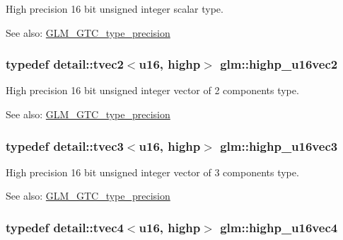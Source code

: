 High precision 16 bit unsigned integer scalar type. \begin{Desc}
\item[See also:]\hyperlink{group__gtc__type__precision}{GLM\_\-GTC\_\-type\_\-precision} \end{Desc}
\hypertarget{group__gtc__type__precision_gfad4245d389a4990eb505cd74a2d0a6f}{
\subsubsection[highp\_\-u16vec2]{\setlength{\rightskip}{0pt plus 5cm}typedef detail::tvec2$<$u16, highp$>$ {\bf glm::highp\_\-u16vec2}}}
\label{group__gtc__type__precision_gfad4245d389a4990eb505cd74a2d0a6f}


High precision 16 bit unsigned integer vector of 2 components type. \begin{Desc}
\item[See also:]\hyperlink{group__gtc__type__precision}{GLM\_\-GTC\_\-type\_\-precision} \end{Desc}
\hypertarget{group__gtc__type__precision_gd98b30ad9bbfb79233340be3ba53ceb6}{
\subsubsection[highp\_\-u16vec3]{\setlength{\rightskip}{0pt plus 5cm}typedef detail::tvec3$<$u16, highp$>$ {\bf glm::highp\_\-u16vec3}}}
\label{group__gtc__type__precision_gd98b30ad9bbfb79233340be3ba53ceb6}


High precision 16 bit unsigned integer vector of 3 components type. \begin{Desc}
\item[See also:]\hyperlink{group__gtc__type__precision}{GLM\_\-GTC\_\-type\_\-precision} \end{Desc}
\hypertarget{group__gtc__type__precision_g89074b108ec0643cffdfd008bedd3ffb}{
\subsubsection[highp\_\-u16vec4]{\setlength{\rightskip}{0pt plus 5cm}typedef detail::tvec4$<$u16, highp$>$ {\bf glm::highp\_\-u16vec4}}}
\label{group__gtc__type__precision_g89074b108ec0643cffdfd008bedd3ffb}


